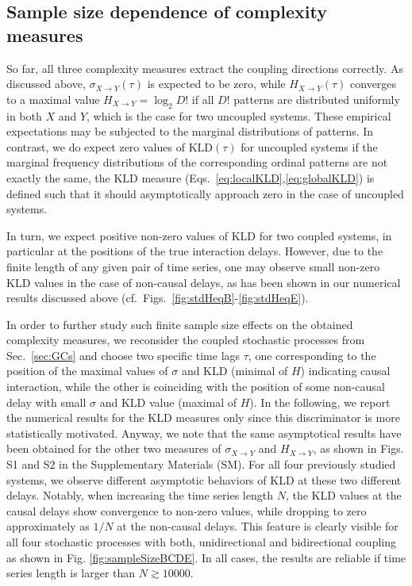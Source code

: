 \documentclass[12pt,aip,cha,reprint,nofootinbib]{revtex4-1}
\begin{document}
\subsection{Sample size dependence of complexity measures}
{\color{red}So far, all three complexity measures extract the coupling directions correctly. As discussed above, $\sigma_{X\to Y}(\tau)$ is expected to be zero, while $H_{X\to Y}(\tau)$ converges to a maximal value $H_{X \to Y} = \log_2 D!$ if all $D!$ patterns are distributed uniformly in both $X$ and $Y$, which is the case for two uncoupled systems. These empirical expectations may be subjected to the marginal distributions of patterns. In contrast, we do expect zero values of $\text{KLD}(\tau)$ for uncoupled systems } if the marginal frequency distributions of the corresponding ordinal patterns are not exactly the same, the KLD measure (Eqs.~\ref{eq:localKLD},\ref{eq:globalKLD}) is defined such that it should asymptotically approach zero in the case of uncoupled systems. 

In turn, we expect positive non-zero values of KLD for two coupled systems, in particular at the positions of the true interaction delays. However, due to the finite length of any given pair of time series, one may observe small non-zero KLD values in the case of non-causal delays, as has been shown in our numerical results discussed above (cf.\ Figs.~\ref{fig:stdHeqB}-\ref{fig:stdHeqE}). 

{\color{red}In order to further study such finite sample size effects on the obtained complexity measures, we reconsider the coupled stochastic processes from Sec.~\ref{sec:GCs} and choose two specific time lags $\tau$, one corresponding to the position of the maximal values of $\sigma$ and KLD (minimal of $H$) indicating causal interaction, while the other is coinciding with the position of some non-causal delay with small $\sigma$ and KLD value (maximal of $H$). In the following, we report the numerical results for the KLD measures only since this discriminator is more statistically motivated. Anyway, we note that the same asymptotical results have been obtained for the other two measures of $\sigma_{X\to Y}$ and $H_{X\to Y}$, as shown in Figs. S1 and S2 in the Supplementary Materials (SM). }
For all four previously studied systems, we observe different asymptotic behaviors of KLD at these two different delays. Notably, when increasing the time series length $N$, the KLD values at the causal delays show convergence to non-zero values, while dropping to zero approximately as $1/N$ at the non-causal delays. This feature is clearly visible for all four stochastic processes with both, unidirectional and bidirectional coupling as shown in Fig. \ref{fig:sampleSizeBCDE}. {\color{red}In all cases, the results are reliable if time series length is larger than $N \gtrsim 10000$. }  
\end{document}

